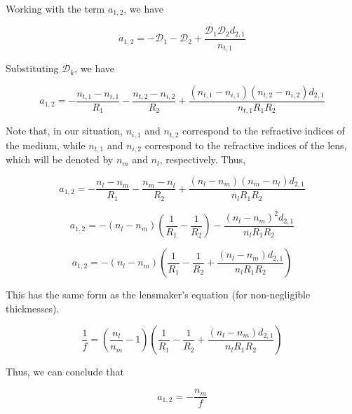 \documentclass[11pt]{article}
\begin{document}
\begin{pproblem}
\begin{pssolution*}{}{}
        \item Working with the term \(a_{1,2}\), we have
        
        \[a_{1,2} = -\mathcal{D}_1 - \mathcal{D}_2 + \frac{\mathcal{D}_1\mathcal{D}_2d_{2,1}}{n_{t,1}}\]

        Substituting \(\mathcal{D}_k\), we have

        \[a_{1,2} = -\frac{n_{t,1}-n_{i,1}}{R_1} - \frac{n_{t,2}-n_{i,2}}{R_2} + \frac{(n_{t,1}-n_{i,1})(n_{t,2}-n_{i,2})d_{2,1}}{n_{t,1}R_1R_2}\]

        Note that, in our situation, \(n_{i,1}\) and \(n_{t,2}\) correspond to the refractive indices of the medium, while \(n_{t,1}\) and \(n_{i,2}\) correspond to the refractive indices of the lens, which will be denoted by \(n_m\) and \(n_l\), respectively. Thus,

        \[a_{1,2} = -\frac{n_{l}-n_{m}}{R_1} - \frac{n_{m}-n_{l}}{R_2} + \frac{(n_{l}-n_{m})(n_{m}-n_{l})d_{2,1}}{n_lR_1R_2}\]

        \[a_{1,2} = - (n_l-n_m)\left(\frac{1}{R_1}-\frac{1}{R_2}\right) - \frac{(n_l-n_m)^2 d_{2,1}}{n_lR_1R_2}\]

        \[a_{1,2} = -(n_l-n_m)\left(\frac{1}{R_1}-\frac{1}{R_2} + \frac{(n_l-n_m)d_{2,1}}{n_l R_1R_2}\right)\]

        This has the same form as the lensmaker's equation (for non-negligible thicknesses).

        \[\frac{1}{f} = \left(\frac{n_l}{n_m}-1\right)\left(\frac{1}{R_1}-\frac{1}{R_2} + \frac{(n_l-n_m)d_{2,1}}{n_l R_1R_2}\right)\]

        Thus, we can conclude that

        \[\boxed{a_{1,2} = -\frac{n_m}{f}}\]

\end{pssolution*}

\end{pproblem}
\end{document}
